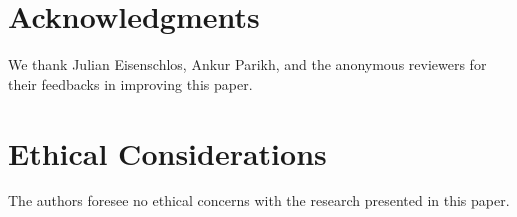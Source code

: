 \documentclass[11pt]{article}
\begin{document}
\section*{Acknowledgments}

We thank Julian Eisenschlos, Ankur Parikh, and the anonymous reviewers for their feedbacks in improving this paper.

\section*{Ethical Considerations}

The authors foresee no ethical concerns with the research presented in this paper.










\end{document}

